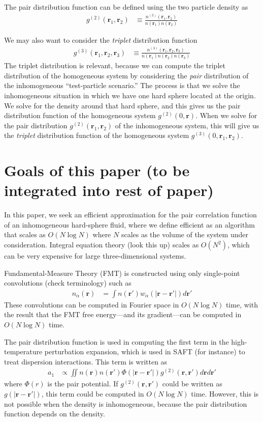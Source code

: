 \documentclass[letterpaper,twocolumn,amsmath,amssymb,pre]{revtex4-1}
\newcommand{\rr}{\textbf{r}}
\begin{document}
The pair distribution function can be defined using the two particle
density as
\begin{align}
  g^{(2)}(\rr_1,\rr_2) &\equiv \frac{n^{(2)}(\rr_1,\rr_2)}{n(\rr_1)n(\rr_2)}
\end{align}

We may also want to consider the \emph{triplet} distribution function
\begin{align}
  g^{(3)}(\rr_1,\rr_2,\rr_3) &\equiv \frac{n^{(3)}(\rr_1,\rr_2,\rr_3)}{n(\rr_1)n(\rr_2)n(\rr_3)}
\end{align}
The triplet distribution is relevant, because we can compute the
triplet distribution of the homogeneous system by considering the
\emph{pair} distribution of the inhomogeneous ``test-particle
scenario.''  The process is that we solve the inhomogeneous situation
in which we have one hard sphere located at the origin.  We solve for
the density around that hard sphere, and this gives us the pair
distribution function of the homogeneous system $g^{(2)}(0, \rr)$.
When we solve for the pair distribution $g^{(2)}(\rr_1,\rr_2)$ of the
inhomogeneous system, this will give us the \emph{triplet}
distribution function of the homogeneous system
$g^{(3)}(0,\rr_1,\rr_2)$.

\section{Goals of this paper (to be integrated into rest of paper)}


In this paper, we seek an efficient approximation for the pair
correlation function of an inhomogeneous hard-sphere fluid, where we
define efficient as an algorithm that scales as $O(N\log N)$ where $N$
scales as the volume of the system under consideration.
Integral equation theory (look this up) scales as $O(N^2)$, which can
be very expensive for large three-dimensional systems.

Fundamental-Measure Theory (FMT) is constructed using only single-point
convolutions (check terminology) such as
\begin{align}
  n_\alpha(\rr) &= \int n(\rr')w_\alpha(|\rr-\rr'|) d\rr'
\end{align}
These convolutions can be computed in Fourier space in $O(N\log N)$
time, with the result that the FMT free energy---and its
gradient---can be computed in $O(N\log N)$ time.

The pair distribution function is used in computing the first term in
the high-temperature perturbation expansion, which is used in SAFT
(for instance) to treat dispersion interactions.  This term is written
as
\begin{align}\label{eq:a1}
  a_1 &\propto \iint n(\rr)n(\rr') \Phi(|\rr-\rr'|)
  g^{(2)}(\rr,\rr')d\rr d\rr'
\end{align}
where $\Phi(r)$ is the pair potential.  If $g^{(2)}(\rr,\rr')$ could
be written as $g(|\rr-\rr'|)$, this term could be computed in $O(N\log
N)$ time.  However, this is not possible when the density is
inhomogeneous, because the pair distribution function depends on the
density.
\end{document}
